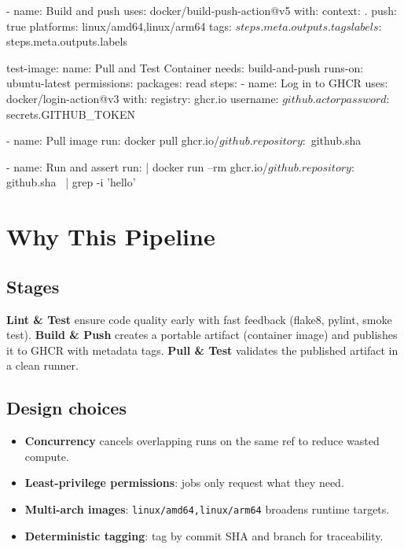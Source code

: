 \documentclass[11pt]{article}
\begin{document}
\begin{mdframed}[style=codebox]
\begin{yamlcode}
      - name: Build and push
        uses: docker/build-push-action@v5
        with:
          context: .
          push: true
          platforms: linux/amd64,linux/arm64
          tags: ${{ steps.meta.outputs.tags }}
          labels: ${{ steps.meta.outputs.labels }}

  test-image:
    name: Pull and Test Container
    needs: build-and-push
    runs-on: ubuntu-latest
    permissions:
      packages: read
    steps:
      - name: Log in to GHCR
        uses: docker/login-action@v3
        with:
          registry: ghcr.io
          username: ${{ github.actor }}
          password: ${{ secrets.GITHUB_TOKEN }}

      - name: Pull image
        run: docker pull ghcr.io/${{ github.repository }}:${{ github.sha }}

      - name: Run and assert
        run: |
          docker run --rm ghcr.io/${{ github.repository }}:${{ github.sha }} \
            | grep -i 'hello'
\end{yamlcode}
\end{mdframed}

\section{Why This Pipeline}

\subsection{Stages}

\textbf{Lint \& Test} ensure code quality early with fast feedback (flake8, pylint, smoke test). \textbf{Build \& Push} creates a portable artifact (container image) and publishes it to GHCR with metadata tags. \textbf{Pull \& Test} validates the published artifact in a clean runner.

\subsection{Design choices}

\begin{itemize}
  \item \textbf{Concurrency} cancels overlapping runs on the same ref to reduce wasted compute.
  \item \textbf{Least-privilege permissions}: jobs only request what they need.
  \item \textbf{Multi-arch images}: \texttt{linux/amd64,linux/arm64} broadens runtime targets.
  \item \textbf{Deterministic tagging}: tag by commit SHA and branch for traceability.
\end{itemize}
\end{document}
